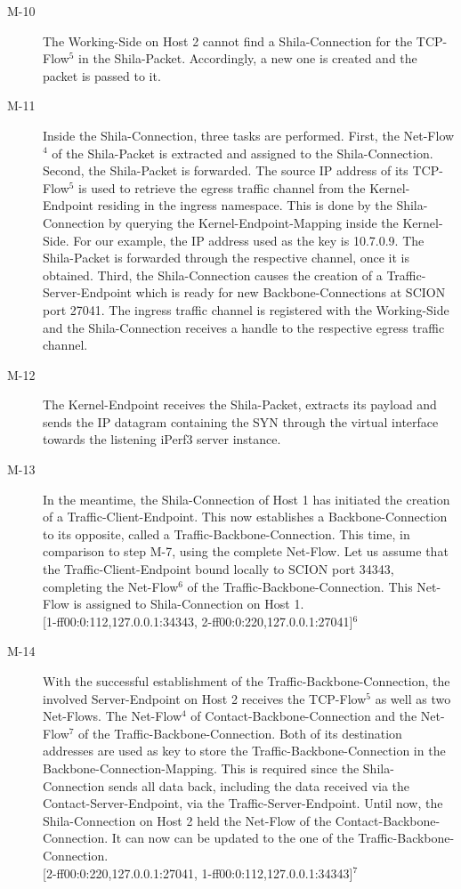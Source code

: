 \begin{description}
	\item[M-10] The Working-Side on Host 2 cannot find a Shila-Connection for the TCP-Flow$^{5}$ in the Shila-Packet. Accordingly, a new one is created and the packet is passed to it.
	\item[M-11] Inside the Shila-Connection, three tasks are performed. First, the Net-Flow$^{4}$ of the Shila-Packet is extracted and assigned to the Shila-Connection.  %
	Second, the Shila-Packet is forwarded. The source IP address of its TCP-Flow$^{5}$ is used to retrieve the egress traffic channel from the Kernel-Endpoint residing in the ingress namespace. This is done by the Shila-Connection by querying the Kernel-Endpoint-Mapping inside the Kernel-Side. For our example, the IP address used as the key is {\footnotesize 10.7.0.9}. The Shila-Packet is forwarded through the respective channel, once it is obtained. Third, the Shila-Connection causes the creation of a Traffic-Server-Endpoint which is ready for new Backbone-Connections at SCION port {\footnotesize 27041}. The ingress traffic channel is registered with the Working-Side and the Shila-Connection receives a handle to the respective egress traffic channel.
	\item[M-12] The Kernel-Endpoint receives the Shila-Packet, extracts its payload and sends the IP datagram containing the SYN through the virtual interface towards the listening iPerf3 server instance.
	\item[M-13] In the meantime, the Shila-Connection of Host 1 has initiated the creation of a Traffic-Client-Endpoint. This now establishes a Backbone-Connection to its opposite, called a Traffic-Backbone-Connection. This time, in comparison to step M-7, using the complete Net-Flow. Let us assume that the Traffic-Client-Endpoint bound locally to SCION port {\footnotesize 34343}, completing the Net-Flow$^{6}$ of the Traffic-Backbone-Connection. This Net-Flow is assigned to Shila-Connection on Host 1.
	\medskip\\{\footnotesize [1-ff00:0:112,127.0.0.1:34343, 2-ff00:0:220,127.0.0.1:27041]$^{6}$}
	\item[M-14] With the successful establishment of the Traffic-Backbone-Connection, the involved Server-Endpoint on Host 2 receives the TCP-Flow$^{5}$ as well as two Net-Flows. The Net-Flow$^{4}$ of Contact-Backbone-Connection and the Net-Flow$^{7}$ of the Traffic-Backbone-Connection. Both of its destination addresses are used as key to store the Traffic-Backbone-Connection in the Backbone-Connection-Mapping. This is required since the Shila-Connection sends all data back, including the data received via the Contact-Server-Endpoint, via the Traffic-Server-Endpoint. Until now, the Shila-Connection on Host 2 held the Net-Flow of the Contact-Backbone-Connection. It can now can be updated to the one of the Traffic-Backbone-Connection.\medskip\\{\footnotesize [2-ff00:0:220,127.0.0.1:27041, 1-ff00:0:112,127.0.0.1:34343]$^{7}$}
\end{description}	
